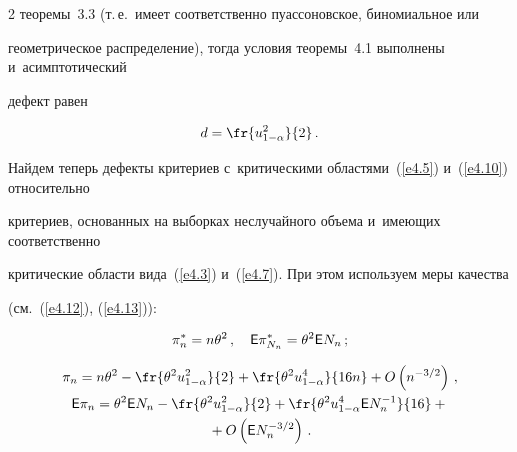 \begin{multicols}{2}
теоремы~3.3 (т.\,е.\ имеет соответственно пуассоновское, биномиальное или 


геометрическое распределение), тогда условия теоремы~4.1 выполнены и~асимптотический 


дефект равен


$$


d = \fr{u_{1-\alpha}^2}{2}\,.


$$





Найдем теперь дефекты критериев с~критическими областями~(\ref{e4.5}) и~(\ref{e4.10}) относительно 


критериев, основанных на выборках неслучайного объема и~имеющих соответственно 


критические области вида~(\ref{e4.3}) и~(\ref{e4.7}). При этом используем меры качества 


(см.~(\ref{e4.12}), (\ref{e4.13})):


\begin{equation}


\pi_n^* = n \theta^2\,,\quad 


{\sf E} \pi_{N_n}^* = \theta^2 {\sf E} N_{n}\,;


\label{e4.17}


\end{equation}





\vspace*{-12pt}





\noindent


\begin{multline}


\pi_n = n \theta^2 - \fr{\theta^2u_{1-\alpha}^2}{2} + 


\fr{\theta^2u_{1-\alpha}^4}{16n} +  O\left(n^{-3/2}\right)\,,


\\


{\sf E} \pi_n = \theta^2 {\sf E} N_n - \fr{\theta^2u_{1-\alpha}^2}{2} + 


\fr{\theta^2u_{1-\alpha}^4 {\sf E} N_n^{-1}}{16} +{}\\


{}+  O\left({\sf E} N_n^{-3/2}\right)\,.


\label{e4.18}


\end{multline}



\end{multicols}
